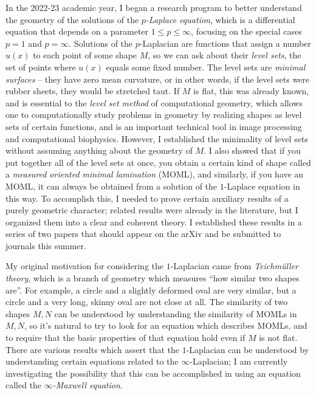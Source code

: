 \documentclass[12pt]{article}
\begin{document}
In the 2022-23 academic year, I began a research program to better understand the geometry of the solutions of the \emph{$p$-Laplace equation}, which is a differential equation that depends on a parameter $1 \leq p \leq \infty$, focusing on the special cases $p = 1$ and $p = \infty$.
Solutions of the $p$-Laplacian are functions that assign a number $u(x)$ to each point of some shape $M$, so we can ask about their \emph{level sets}, the set of points where $u(x)$ equals some fixed number.
The level sets are \emph{minimal surfaces} -- they have zero mean curvature, or in other words, if the level sets were rubber sheets, they would be stretched taut.
If $M$ is flat, this was already known, and is essential to the \emph{level set method} of computational geometry, which allows one to computationally study problems in geometry by realizing shapes as level sets of certain functions, and is an important technical tool in image processing and computational biophysics.
However, I established the minimality of level sets without assuming anything about the geometry of $M$.
I also showed that if you put together all of the level sets at once, you obtain a certain kind of shape called a \emph{measured oriented minimal lamination} (MOML), and similarly, if you have an MOML, it can always be obtained from a solution of the $1$-Laplace equation in this way.
To accomplish this, I needed to prove certain auxiliary results of a purely geometric character; related results were already in the literature, but I organized them into a clear and coherent theory.
I established these results in a series of two papers that should appear on the arXiv and be submitted to journals this summer.

My original motivation for considering the $1$-Laplacian came from \emph{Teichm\"uller theory}, which is a branch of geometry which measures ``how similar two shapes are''.
For example, a circle and a slightly deformed oval are very similar, but a circle and a very long, skinny oval are not close at all.
The similarity of two shapes $M, N$ can be understood by understanding the similarity of MOMLs in $M, N$, so it's natural to try to look for an equation which describes MOMLs, and to require that the basic properties of that equation hold even if $M$ is not flat.
There are various results which assert that the $1$-Laplacian can be understood by understanding certain equations related to the $\infty$-Laplacian; I am currently investigating the possibility that this can be accomplished in using an equation called the \emph{$\infty$-Maxwell equation}.


%
%
\end{document}
